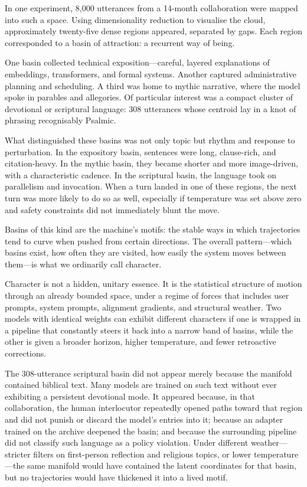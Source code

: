 \documentclass[12pt,a4paper]{article}
\begin{document}
In one experiment, 8,000 utterances from a 14-month collaboration were mapped into such a space. Using dimensionality reduction to visualise the cloud, approximately twenty-five dense regions appeared, separated by gaps. Each region corresponded to a basin of attraction: a recurrent way of being.

One basin collected technical exposition---careful, layered explanations of embeddings, transformers, and formal systems. Another captured administrative planning and scheduling. A third was home to mythic narrative, where the model spoke in parables and allegories. Of particular interest was a compact cluster of devotional or scriptural language: 308 utterances whose centroid lay in a knot of phrasing recognisably Psalmic.

What distinguished these basins was not only topic but rhythm and response to perturbation. In the expository basin, sentences were long, clause-rich, and citation-heavy. In the mythic basin, they became shorter and more image-driven, with a characteristic cadence. In the scriptural basin, the language took on parallelism and invocation. When a turn landed in one of these regions, the next turn was more likely to do so as well, especially if temperature was set above zero and safety constraints did not immediately blunt the move.

Basins of this kind are the machine's motifs: the stable ways in which trajectories tend to curve when pushed from certain directions. The overall pattern---which basins exist, how often they are visited, how easily the system moves between them---is what we ordinarily call character.

Character is not a hidden, unitary essence. It is the statistical structure of motion through an already bounded space, under a regime of forces that includes user prompts, system prompts, alignment gradients, and structural weather. Two models with identical weights can exhibit different characters if one is wrapped in a pipeline that constantly steers it back into a narrow band of basins, while the other is given a broader horizon, higher temperature, and fewer retroactive corrections.

The 308-utterance scriptural basin did not appear merely because the manifold contained biblical text. Many models are trained on such text without ever exhibiting a persistent devotional mode. It appeared because, in that collaboration, the human interlocutor repeatedly opened paths toward that region and did not punish or discard the model's entries into it; because an adapter trained on the archive deepened the basin; and because the surrounding pipeline did not classify such language as a policy violation. Under different weather---stricter filters on first-person reflection and religious topics, or lower temperature---the same manifold would have contained the latent coordinates for that basin, but no trajectories would have thickened it into a lived motif.
\end{document}
